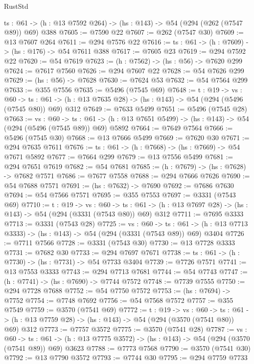 \begin{lexlean}{RustStd}
\begin{coremodule}
  {ts : @61} -> (h : @13 @7592 @264) -> (hs : @143) -> @54 (@294 (@262 (@7547 @89)) @69) @388
@7605 := @7590 @22
@7607 := @262 (@7547 @30)
@7609 := @13 @7607 @264
@7611 := @294 @7576 @22
@7616 := {ts : @61} -> (h : @7609) -> (hs : @176) -> @54 @7611 @388
@7617 := @7605 @23
@7619 := @294 @7592 @22
@7620 := @54 @7619
@7623 := (h : @7562) -> (hs : @56) -> @7620 @299
@7624 := @7617 @7560
@7626 := @294 @7607 @22
@7628 := @54 @7626 @299
@7629 := (hs : @56) -> @7628
@7630 := @7624 @53
@7632 := @54 @7564 @299
@7633 := @355 @7556
@7635 := @5496 (@7545 @69)
@7648 := {t : @19} ->
  {vs : @60} ->
  {ts : @61} -> (h : @13 @7635 @28) -> (hs : @143) -> @54 (@294 (@5496 (@7545 @80)) @69) @312
@7649 := @7633 @5499
@7651 := @5496 (@7545 @28)
@7663 := {vs : @60} ->
  {ts : @61} -> (h : @13 @7651 @5499) -> (hs : @143) -> @54 (@294 (@5496 (@7545 @89)) @69) @5892
@7664 := @7649 @7564
@7666 := @5496 (@7545 @30)
@7668 := @13 @7666 @5499
@7669 := @7620 @30
@7671 := @294 @7635 @7611
@7676 := {ts : @61} -> (h : @7668) -> (hs : @7669) -> @54 @7671 @5892
@7677 := @7664 @299
@7679 := @13 @7556 @5499
@7681 := @294 @7651 @7619
@7682 := @54 @7681
@7685 := (h : @7679) -> (hs : @7628) -> @7682 @7571
@7686 := @7677 @7558
@7688 := @294 @7666 @7626
@7690 := @54 @7688 @7571
@7691 := (hs : @7632) -> @7690
@7692 := @7686 @7630
@7694 := @54 @7566 @7571
@7695 := @355 @7553
@7697 := @3331 (@7543 @69)
@7710 := {t : @19} ->
  {vs : @60} ->
  {ts : @61} -> (h : @13 @7697 @28) -> (hs : @143) -> @54 (@294 (@3331 (@7543 @80)) @69) @312
@7711 := @7695 @3333
@7713 := @3331 (@7543 @28)
@7725 := {vs : @60} ->
  {ts : @61} -> (h : @13 @7713 @3333) -> (hs : @143) -> @54 (@294 (@3331 (@7543 @89)) @69) @3404
@7726 := @7711 @7566
@7728 := @3331 (@7543 @30)
@7730 := @13 @7728 @3333
@7731 := @7682 @30
@7733 := @294 @7697 @7671
@7738 := {ts : @61} -> (h : @7730) -> (hs : @7731) -> @54 @7733 @3404
@7739 := @7726 @7571
@7741 := @13 @7553 @3333
@7743 := @294 @7713 @7681
@7744 := @54 @7743
@7747 := (h : @7741) -> (hs : @7690) -> @7744 @7572
@7748 := @7739 @7555
@7750 := @294 @7728 @7688
@7752 := @54 @7750 @7572
@7753 := (hs : @7694) -> @7752
@7754 := @7748 @7692
@7756 := @54 @7568 @7572
@7757 := @355 @7549
@7759 := @3570 (@7541 @69)
@7772 := {t : @19} ->
  {vs : @60} ->
  {ts : @61} -> (h : @13 @7759 @28) -> (hs : @143) -> @54 (@294 (@3570 (@7541 @80)) @69) @312
@7773 := @7757 @3572
@7775 := @3570 (@7541 @28)
@7787 := {vs : @60} ->
  {ts : @61} -> (h : @13 @7775 @3572) -> (hs : @143) -> @54 (@294 (@3570 (@7541 @89)) @69) @3623
@7788 := @7773 @7568
@7790 := @3570 (@7541 @30)
@7792 := @13 @7790 @3572
@7793 := @7744 @30
@7795 := @294 @7759 @7733

\end{coremodule}
\end{lexlean}

